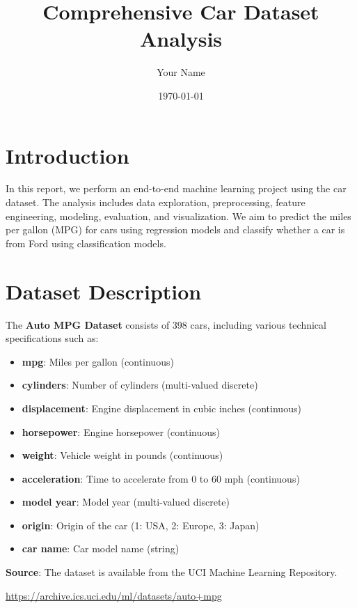 \documentclass{article}
\title{Comprehensive Car Dataset Analysis}
\author{Your Name}
\date{\today}
\begin{document}
\maketitle

\tableofcontents

\section{Introduction}

In this report, we perform an end-to-end machine learning project using the car dataset. The analysis includes data exploration, preprocessing, feature engineering, modeling, evaluation, and visualization. We aim to predict the miles per gallon (MPG) for cars using regression models and classify whether a car is from Ford using classification models.

\section{Dataset Description}

The \textbf{Auto MPG Dataset} consists of 398 cars, including various technical specifications such as:

\begin{itemize}
    \item \textbf{mpg}: Miles per gallon (continuous)
    \item \textbf{cylinders}: Number of cylinders (multi-valued discrete)
    \item \textbf{displacement}: Engine displacement in cubic inches (continuous)
    \item \textbf{horsepower}: Engine horsepower (continuous)
    \item \textbf{weight}: Vehicle weight in pounds (continuous)
    \item \textbf{acceleration}: Time to accelerate from 0 to 60 mph (continuous)
    \item \textbf{model year}: Model year (multi-valued discrete)
    \item \textbf{origin}: Origin of the car (1: USA, 2: Europe, 3: Japan)
    \item \textbf{car name}: Car model name (string)
\end{itemize}

\textbf{Source}: The dataset is available from the UCI Machine Learning Repository.

\url{https://archive.ics.uci.edu/ml/datasets/auto+mpg}
\end{document}

